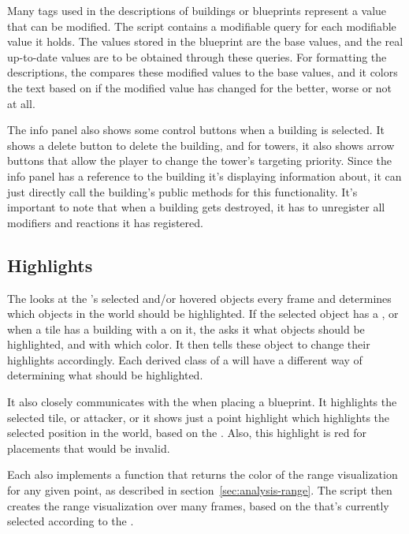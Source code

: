 Many tags used in the descriptions of buildings or blueprints represent a value that can be modified.
The  script contains a modifiable query for each modifiable value it holds.
The values stored in the blueprint are the base values, and the real up-to-date values are to be obtained through these queries.
For formatting the descriptions, the  compares these modified values to the base values, and it colors the text based on if the modified value has changed for the better, worse or not at all.

The info panel also shows some control buttons when a building is selected.
It shows a delete button to delete the building, and for towers, it also shows arrow buttons that allow the player to change the tower's targeting priority.
Since the info panel has a reference to the building it's displaying information about, it can just directly call the building's public methods for this functionality.
It's important to note that when a building gets destroyed, it has to unregister all modifiers and reactions it has registered.

\subsection{Highlights}

The  looks at the 's selected and/or hovered objects every frame and determines which objects in the world should be highlighted.
If the selected object has a , or when a tile has a building with a  on it, the  asks it what  objects should be highlighted, and with which color.
It then tells these object to change their highlights accordingly.
Each derived class of a  will have a different way of determining what should be highlighted.

It also closely communicates with the  when placing a blueprint.
It highlights the selected tile, or attacker, or it shows just a point highlight which highlights the selected position in the world, based on the .
Also, this highlight is red for placements that would be invalid.

Each  also implements a function that returns the color of the range visualization for any given point, as described in section~\ref{sec:analysis-range}.
The script  then creates the range visualization over many frames, based on the  that's currently selected according to the .

